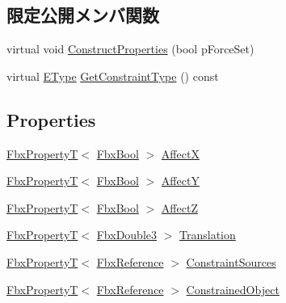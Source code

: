 \subsection*{限定公開メンバ関数}
\begin{DoxyCompactItemize}
\item 
virtual void \hyperlink{class_fbx_constraint_position_adb2f3e784d01313ecc859b7cda16c182}{Construct\+Properties} (bool p\+Force\+Set)
\item 
virtual \hyperlink{class_fbx_constraint_a49c1634663395eab7c28856df233ec66}{E\+Type} \hyperlink{class_fbx_constraint_position_a79f710b1fec4b1285b53dec13ea68824}{Get\+Constraint\+Type} () const
\end{DoxyCompactItemize}
\subsection*{Properties}
\begin{DoxyCompactItemize}
\item 
\hyperlink{class_fbx_property_t}{Fbx\+PropertyT}$<$ \hyperlink{fbxtypes_8h_a92e0562b2fe33e76a242f498b362262e}{Fbx\+Bool} $>$ \hyperlink{class_fbx_constraint_position_a2488e70c6bd35dd13cafa4234a21ca5c}{AffectX}
\item 
\hyperlink{class_fbx_property_t}{Fbx\+PropertyT}$<$ \hyperlink{fbxtypes_8h_a92e0562b2fe33e76a242f498b362262e}{Fbx\+Bool} $>$ \hyperlink{class_fbx_constraint_position_afa5910286c656a2e87398645e3e3114d}{AffectY}
\item 
\hyperlink{class_fbx_property_t}{Fbx\+PropertyT}$<$ \hyperlink{fbxtypes_8h_a92e0562b2fe33e76a242f498b362262e}{Fbx\+Bool} $>$ \hyperlink{class_fbx_constraint_position_a4d99852028aff66edc99d669d2f1bbae}{AffectZ}
\item 
\hyperlink{class_fbx_property_t}{Fbx\+PropertyT}$<$ \hyperlink{fbxtypes_8h_ae0a96f14cde566774c7553aa7523b7a7}{Fbx\+Double3} $>$ \hyperlink{class_fbx_constraint_position_a90906bf60f276cd04cb1afebce8b9816}{Translation}
\item 
\hyperlink{class_fbx_property_t}{Fbx\+PropertyT}$<$ \hyperlink{fbxtypes_8h_a44df6a2eec915cf27cd481e5c5e48a24}{Fbx\+Reference} $>$ \hyperlink{class_fbx_constraint_position_a52d5190a6c10807e4f52383d05ceae38}{Constraint\+Sources}
\item 
\hyperlink{class_fbx_property_t}{Fbx\+PropertyT}$<$ \hyperlink{fbxtypes_8h_a44df6a2eec915cf27cd481e5c5e48a24}{Fbx\+Reference} $>$ \hyperlink{class_fbx_constraint_position_a5b6779be7ae7e754c31aac3552990df3}{Constrained\+Object}
\end{DoxyCompactItemize}
